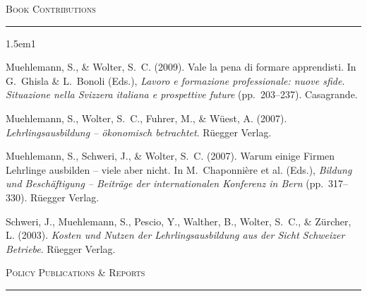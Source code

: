 \documentclass[11pt,a4paper]{article}
\newcommand{\cvsection}[1]{%
  \vspace{1.1em}%
  {\large\textsc{#1}}\par
  \vspace{0.15em}\hrule\vspace{0.65em}%
}
\begin{document}
\cvsection{Book Contributions}

\begin{hangparas}{1.5em}{1}

Muehlemann, S., \& Wolter, S.~C. (2009). Vale la pena di formare apprendisti. In G.~Ghisla \& L.~Bonoli (Eds.), \textit{Lavoro e formazione professionale: nuove sfide. Situazione nella Svizzera italiana e prospettive future} (pp.~203--237). Casagrande.

Muehlemann, S., Wolter, S.~C., Fuhrer, M., \& W\"uest, A. (2007). \textit{Lehrlingsausbildung -- \"okonomisch betrachtet}. R\"uegger Verlag.

Muehlemann, S., Schweri, J., \& Wolter, S.~C. (2007). Warum einige Firmen Lehrlinge ausbilden -- viele aber nicht. In M.~Chaponni\`ere et al. (Eds.), \textit{Bildung und Besch\"aftigung -- Beitr\"age der internationalen Konferenz in Bern} (pp.~317--330). R\"uegger Verlag.

Schweri, J., Muehlemann, S., Pescio, Y., Walther, B., Wolter, S.~C., \& Z\"urcher, L. (2003). \textit{Kosten und Nutzen der Lehrlingsausbildung aus der Sicht Schweizer Betriebe}. R\"uegger Verlag.

\end{hangparas}

\cvsection{Policy Publications \& Reports}
\end{document}
